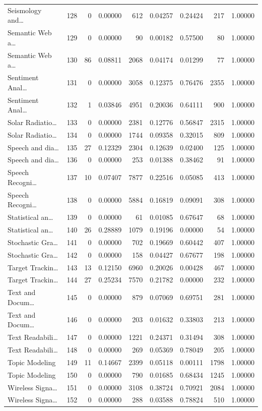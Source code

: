 \begin{table}
\begin{tabular}{lrrrrrrrr}
Seismology and… & 128 & 0 & 0.00000 & 612 & 0.04257 & 0.24424 & 217 & 1.00000 \\
Semantic Web a… & 129 & 0 & 0.00000 & 90 & 0.00182 & 0.57500 & 80 & 1.00000 \\
Semantic Web a… & 130 & 86 & 0.08811 & 2068 & 0.04174 & 0.01299 & 77 & 1.00000 \\
Sentiment Anal… & 131 & 0 & 0.00000 & 3058 & 0.12375 & 0.76476 & 2355 & 1.00000 \\
Sentiment Anal… & 132 & 1 & 0.03846 & 4951 & 0.20036 & 0.64111 & 900 & 1.00000 \\
Solar Radiatio… & 133 & 0 & 0.00000 & 2381 & 0.12776 & 0.56847 & 2315 & 1.00000 \\
Solar Radiatio… & 134 & 0 & 0.00000 & 1744 & 0.09358 & 0.32015 & 809 & 1.00000 \\
Speech and dia… & 135 & 27 & 0.12329 & 2304 & 0.12639 & 0.02400 & 125 & 1.00000 \\
Speech and dia… & 136 & 0 & 0.00000 & 253 & 0.01388 & 0.38462 & 91 & 1.00000 \\
Speech Recogni… & 137 & 10 & 0.07407 & 7877 & 0.22516 & 0.05085 & 413 & 1.00000 \\
Speech Recogni… & 138 & 0 & 0.00000 & 5884 & 0.16819 & 0.09091 & 308 & 1.00000 \\
Statistical an… & 139 & 0 & 0.00000 & 61 & 0.01085 & 0.67647 & 68 & 1.00000 \\
Statistical an… & 140 & 26 & 0.28889 & 1079 & 0.19196 & 0.00000 & 54 & 1.00000 \\
Stochastic Gra… & 141 & 0 & 0.00000 & 702 & 0.19669 & 0.60442 & 407 & 1.00000 \\
Stochastic Gra… & 142 & 0 & 0.00000 & 158 & 0.04427 & 0.67677 & 198 & 1.00000 \\
Target Trackin… & 143 & 13 & 0.12150 & 6960 & 0.20026 & 0.00428 & 467 & 1.00000 \\
Target Trackin… & 144 & 27 & 0.25234 & 7570 & 0.21782 & 0.00000 & 232 & 1.00000 \\
Text and Docum… & 145 & 0 & 0.00000 & 879 & 0.07069 & 0.69751 & 281 & 1.00000 \\
Text and Docum… & 146 & 0 & 0.00000 & 203 & 0.01632 & 0.33803 & 213 & 1.00000 \\
Text Readabili… & 147 & 0 & 0.00000 & 1221 & 0.24371 & 0.31494 & 308 & 1.00000 \\
Text Readabili… & 148 & 0 & 0.00000 & 269 & 0.05369 & 0.78049 & 205 & 1.00000 \\
Topic Modeling & 149 & 11 & 0.14667 & 2399 & 0.05118 & 0.00111 & 1798 & 1.00000 \\
Topic Modeling & 150 & 0 & 0.00000 & 790 & 0.01685 & 0.68434 & 1245 & 1.00000 \\
Wireless Signa… & 151 & 0 & 0.00000 & 3108 & 0.38724 & 0.70921 & 2084 & 1.00000 \\
Wireless Signa… & 152 & 0 & 0.00000 & 288 & 0.03588 & 0.78824 & 510 & 1.00000 \\
\bottomrule
\end{tabular}
\end{table}
